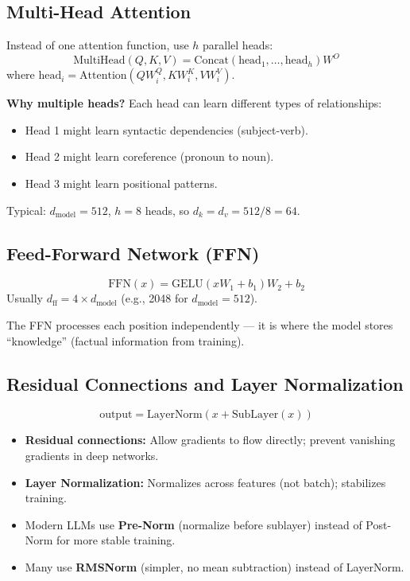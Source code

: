 \documentclass[11pt,a4paper]{article}
\begin{document}
\subsection{Multi-Head Attention}
Instead of one attention function, use $h$ parallel heads:
\[
\text{MultiHead}(Q,K,V) = \text{Concat}(\text{head}_1, \ldots, \text{head}_h) W^O
\]
where $\text{head}_i = \text{Attention}(Q W_i^Q, K W_i^K, V W_i^V)$.

\textbf{Why multiple heads?}
Each head can learn different types of relationships:
\begin{itemize}[nosep]
  \item Head 1 might learn syntactic dependencies (subject-verb).
  \item Head 2 might learn coreference (pronoun to noun).
  \item Head 3 might learn positional patterns.
\end{itemize}

Typical: $d_{\text{model}} = 512$, $h = 8$ heads, so $d_k = d_v = 512/8 = 64$.

\subsection{Feed-Forward Network (FFN)}
\[
\text{FFN}(x) = \text{GELU}(x W_1 + b_1) W_2 + b_2
\]
Usually $d_{\text{ff}} = 4 \times d_{\text{model}}$ (e.g., 2048 for $d_{\text{model}}=512$).

The FFN processes each position independently --- it is where the model stores ``knowledge'' (factual information from training).

\subsection{Residual Connections and Layer Normalization}
\[
\text{output} = \text{LayerNorm}(x + \text{SubLayer}(x))
\]
\begin{itemize}[nosep]
  \item \textbf{Residual connections:} Allow gradients to flow directly; prevent vanishing gradients in deep networks.
  \item \textbf{Layer Normalization:} Normalizes across features (not batch); stabilizes training.
  \item Modern LLMs use \textbf{Pre-Norm} (normalize before sublayer) instead of Post-Norm for more stable training.
  \item Many use \textbf{RMSNorm} (simpler, no mean subtraction) instead of LayerNorm.
\end{itemize}
\end{document}
